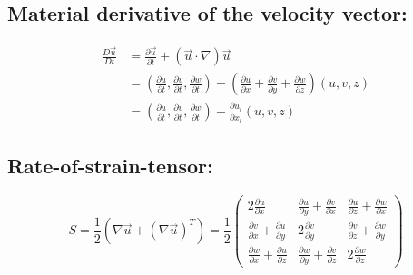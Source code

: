\documentclass{article}
\begin{document}
\subsection{Material derivative of the velocity vector:}
    \begin{equation}
        \begin{aligned}
        \frac{D\vec{u}}{Dt} &= \frac{\partial \vec{u}}{\partial t} + (\vec{u} \cdot \nabla) \vec{u} \\
        &= \left(\frac{\partial u}{\partial t}, \frac{\partial v}{\partial t}, \frac{\partial w}{\partial t}\right) + \left(\frac{\partial u}{\partial x} + \frac{\partial v}{\partial y} + \frac{\partial w}{\partial z}\right) \left(u, v, z\right) \\
        &= \left(\frac{\partial u}{\partial t}, \frac{\partial v}{\partial t}, \frac{\partial w}{\partial t}\right) + \frac{\partial u_i}{\partial x_i} \left(u, v, z\right)
        \end{aligned}
    \end{equation}
\subsection{Rate-of-strain-tensor:}
    \begin{equation}
        S = \frac{1}{2} \left(\nabla \vec{u} + (\nabla \vec{u})^T\right) = \frac{1}{2} \begin{pmatrix} 
            2 \frac{\partial u}{\partial x} & \frac{\partial u}{\partial y} + \frac{\partial v}{\partial x} & \frac{\partial u}{\partial z} + \frac{\partial w}{\partial x} \\
            \frac{\partial v}{\partial x} + \frac{\partial u}{\partial y} & 2 \frac{\partial v}{\partial y} & \frac{\partial v}{\partial z} + \frac{\partial w}{\partial y} \\
            \frac{\partial w}{\partial x} + \frac{\partial u}{\partial z} & \frac{\partial w}{\partial y} + \frac{\partial v}{\partial z} & 2 \frac{\partial w}{\partial z}
            \end{pmatrix}
    \end{equation}
\end{document}
